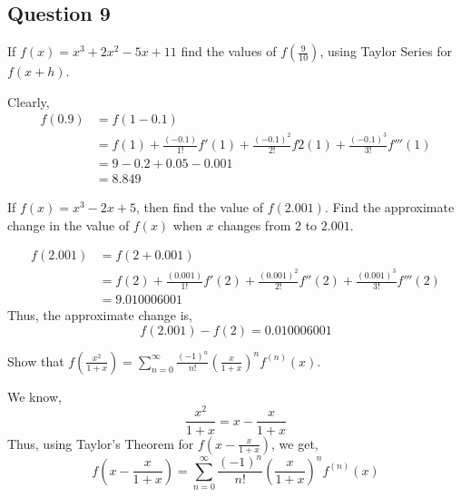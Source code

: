 \subsection{Question 9}
\begin{asign}
	If $f(x)=x^3+2x^2-5x+11$ find the values of $f(\frac{9}{10})$, using Taylor Series for $f(x+h)$.
\end{asign}
\begin{anse}
	Clearly,
	\[\begin{split}
		f(0.9)&=f(1-0.1)\\
		&=f(1)+\frac{(-0.1)}{1!}f'(1)+\frac{(-0.1)^2}{2!}f2(1)+\frac{(-0.1)^3}{3!}f'''(1)\\
		&=9-0.2+0.05-0.001\\
		&=8.849
	\end{split}\]
\end{anse}
\begin{asign}
	If $f(x)=x^3-2x+5$, then find the value of $f(2.001)$. Find the approximate change in the value of $f(x)$ when $x$ changes from $2$ to $2.001$.
\end{asign}
\begin{anse}
	\[\begin{split}
		f(2.001)&=f(2+0.001)\\
		&=f(2)+\frac{(0.001)}{1!}f'(2)+\frac{(0.001)^2}{2!}f''(2)+\frac{(0.001)^3}{3!}f'''(2)\\
		&= 9.010006001
	\end{split}\]
	Thus, the approximate change is,
	\[f(2.001)-f(2)=0.010006001\]
\end{anse}
\begin{asign}
	Show that $f(\frac{x^2}{1+x})=\sum_{n=0}^{\infty} \frac{(-1)^n}{n!}\left(\frac{x}{1+x}\right)^nf^{(n)}(x)$.
\end{asign}
\begin{anse}
	We know, 
	\[\frac{x^2}{1+x}=x-\frac{x}{1+x}\]
	Thus, using Taylor's Theorem for $f(x-\frac{x}{1+x})$, we get,
	\[f(x-\frac{x}{1+x})=\sum_{n=0}^{\infty} \frac{(-1)^n}{n!}\left(\frac{x}{1+x}\right)^nf^{(n)}(x)\]
\end{anse}






